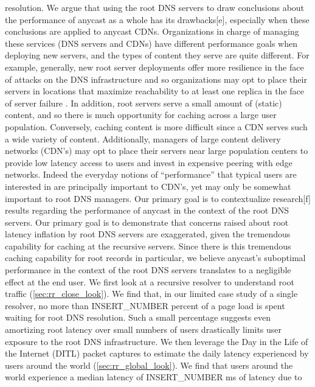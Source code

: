 \documentclass[sigconf,nonacm,10pt]{acmart}
\begin{document}
resolution. \break \break
We argue that using the root DNS servers to draw conclusions about the
performance of anycast as a whole has its drawbacks{[}e{]}, especially
when these conclusions are applied to anycast CDNs. Organizations in
charge of managing these services (DNS servers and CDNs) have different
performance goals when deploying new servers, and the types of content
they serve are quite different. For example, generally, new root server
deployments offer more resilience in the face of attacks on the DNS
infrastructure and so organizations may opt to place their servers in
locations that maximize reachability to at least one replica in the face
of server failure \cite{moura2016anycast}. In addition, root servers
serve a small amount of (static) content, and so there is much
opportunity for caching across a large user population. Conversely,
caching content is more difficult since a CDN serves such a wide variety
of content. Additionally, managers of large content delivery networks
(CDN's) may opt to place their servers near large population centers to
provide low latency access to users and invest in expensive peering with
edge networks. Indeed the everyday notions of ``performance'' that
typical users are interested in are principally important to CDN's, yet
may only be somewhat important to root DNS managers. \break \break
Our primary goal is to contextualize research{[}f{]} results regarding
the performance of anycast in the context of the root DNS servers. Our
primary goal is to demonstrate that concerns raised about root latency
inflation by root DNS servers are exaggerated, given the tremendous
capability for caching at the recursive servers. Since there is this
tremendous caching capability for root records in particular, we believe
anycast's suboptimal performance in the context of the root DNS servers
translates to a negligible effect at the end user. \break
We first look at a recursive resolver to understand root traffic
(\autoref{sec:rr_close_look}). We find that, in our limited case study
of a single resolver, no more than INSERT\_NUMBER percent of a page load
is spent waiting for root DNS resolution. Such a small percentage
suggests even amortizing root latency over small numbers of users
drastically limits user exposure to the root DNS infrastructure. We then
leverage the Day in the Life of the Internet (DITL) \cite{ditl} packet
captures to estimate the daily latency experienced by users around the
world (\autoref{sec:rr_global_look}). We find that users around the
world experience a median latency of INSERT\_NUMBER ms of latency due to
\end{document}
